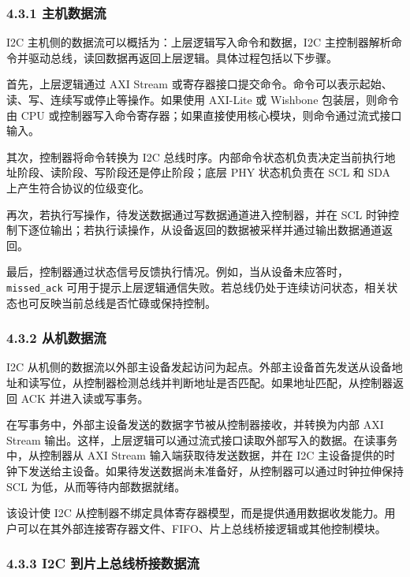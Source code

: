 \subsubsection{4.3.1 主机数据流}\label{ux4e3bux673aux6570ux636eux6d41}

I2C 主机侧的数据流可以概括为：上层逻辑写入命令和数据，I2C 主控制器解析命令并驱动总线，读回数据再返回上层逻辑。具体过程包括以下步骤。

首先，上层逻辑通过 AXI Stream 或寄存器接口提交命令。命令可以表示起始、读、写、连续写或停止等操作。如果使用 AXI-Lite 或 Wishbone 包装层，则命令由 CPU 或控制器写入命令寄存器；如果直接使用核心模块，则命令通过流式接口输入。

其次，控制器将命令转换为 I2C 总线时序。内部命令状态机负责决定当前执行地址阶段、读阶段、写阶段还是停止阶段；底层 PHY 状态机负责在 SCL 和 SDA 上产生符合协议的位级变化。

再次，若执行写操作，待发送数据通过写数据通道进入控制器，并在 SCL 时钟控制下逐位输出；若执行读操作，从设备返回的数据被采样并通过输出数据通道返回。

最后，控制器通过状态信号反馈执行情况。例如，当从设备未应答时，\texttt{missed\_ack} 可用于提示上层逻辑通信失败。若总线仍处于连续访问状态，相关状态也可反映当前总线是否忙碌或保持控制。

\subsubsection{4.3.2 从机数据流}\label{ux4eceux673aux6570ux636eux6d41}

I2C 从机侧的数据流以外部主设备发起访问为起点。外部主设备首先发送从设备地址和读写位，从控制器检测总线并判断地址是否匹配。如果地址匹配，从控制器返回 ACK 并进入读或写事务。

在写事务中，外部主设备发送的数据字节被从控制器接收，并转换为内部 AXI Stream 输出。这样，上层逻辑可以通过流式接口读取外部写入的数据。在读事务中，从控制器从 AXI Stream 输入端获取待发送数据，并在 I2C 主设备提供的时钟下发送给主设备。如果待发送数据尚未准备好，从控制器可以通过时钟拉伸保持 SCL 为低，从而等待内部数据就绪。

该设计使 I2C 从控制器不绑定具体寄存器模型，而是提供通用数据收发能力。用户可以在其外部连接寄存器文件、FIFO、片上总线桥接逻辑或其他控制模块。

\subsubsection{4.3.3 I2C 到片上总线桥接数据流}\label{i2c-ux5230ux7247ux4e0aux603bux7ebfux6865ux63a5ux6570ux636eux6d41}

